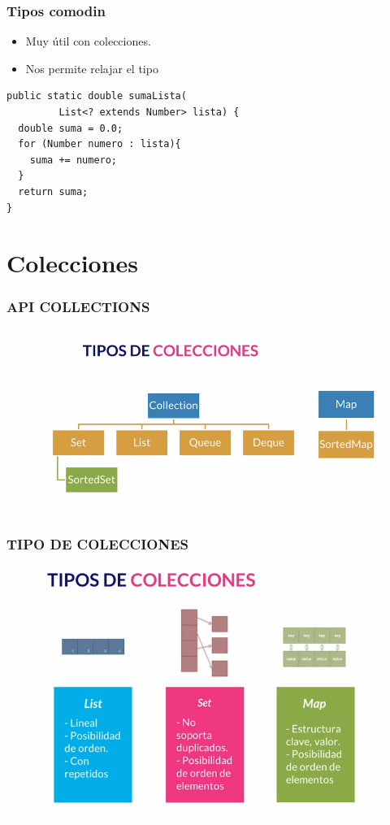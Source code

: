\documentclass{beamer}
\begin{document}
\begin{frame}[fragile]
\frametitle{Tipos comodin}
\begin{itemize}[<+->]
\item Muy útil con colecciones. 
\item Nos permite relajar el tipo
\end{itemize}
\pause
\begin{verbatim}
public static double sumaLista(
         List<? extends Number> lista) {
  double suma = 0.0;
  for (Number numero : lista){
    suma += numero;
  }
  return suma;
}
\end{verbatim}
\end{frame}


\section{Colecciones}

\begin{frame}
\frametitle{API COLLECTIONS}
\begin{figure}
\includegraphics[scale=0.5]{imagenes/colecciones1.png}
\end{figure}
\end{frame}

\begin{frame}
\frametitle{TIPO DE COLECCIONES}
\begin{figure}
\includegraphics[scale=0.5]{imagenes/colecciones2.png}
\end{figure}
\end{frame}
\end{document}
